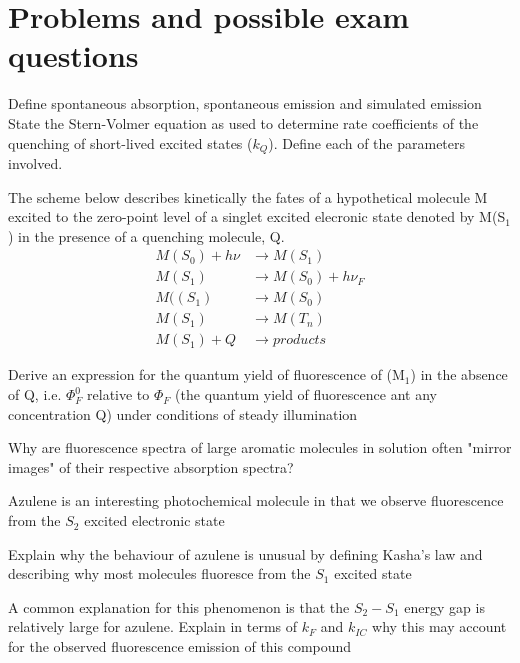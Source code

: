 \documentclass[ignorenonframetext]{beamer}
\begin{document}
\section{Problems and possible exam questions}

\begin{ExerciseList}
\Exercise Define spontaneous absorption, spontaneous emission and simulated emission
State the Stern-Volmer equation as used to determine rate coefficients of the quenching of short-lived excited states (\(k_Q\)). Define each of the parameters involved.

\Exercise The scheme below describes kinetically the fates of a hypothetical molecule M excited to the zero-point level of a singlet excited elecronic state denoted by M(S\(_1\)) in the presence of a quenching molecule, Q.
\begin{align*}
M(S_0) + h\nu &\rightarrow M(S_1)\\
M(S_1) &\rightarrow M(S_0) + h\nu_F\\
M((S_1) &\rightarrow M(S_0)\\
M(S_1) &\rightarrow M(T_n)\\
M(S_1) + Q &\rightarrow products
\end{align*}

\Question Derive an expression for the quantum yield of fluorescence of (M\(_1\)) in the absence of Q, i.e. \(\Phi^0_F\) relative to \(\Phi_F\) (the quantum yield of fluorescence ant any concentration Q) under conditions of steady illumination

\Exercise Why are fluorescence spectra of large aromatic molecules in solution often "mirror images" of their respective absorption spectra?

\Exercise Azulene is an interesting photochemical molecule in that we observe fluorescence from the \(S_2\) excited electronic state

\Question Explain why the behaviour of azulene is unusual by defining Kasha's law and describing why most molecules fluoresce from the \(S_1\) excited state

\Question A common explanation for this phenomenon is that the \(S_2-S_1\) energy gap is relatively large for azulene. Explain in terms of \(k_F\) and \(k_{IC}\) why this may account for the observed fluorescence emission of this compound


\end{ExerciseList}
\end{document}
